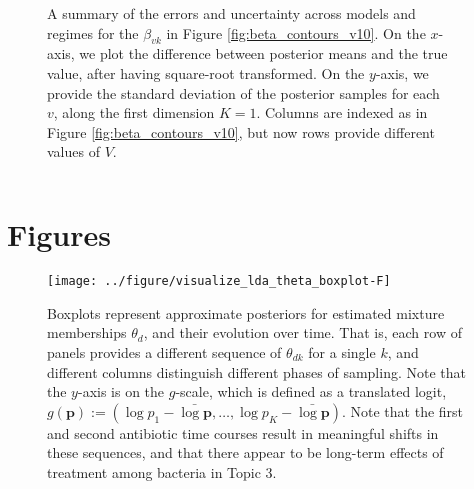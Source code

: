 \documentclass[final]{beamer}
\newlength{\sepwid}
\newlength{\onecolwid}
\begin{document}
\begin{frame}
\begin{columns}
\begin{column}{\onecolwid}
\begin{figure}[!p]
  \centering
  \caption{A summary of the errors and uncertainty across models and regimes for
    the $\beta_{vk}$ in Figure \ref{fig:beta_contours_v10}. On the $x$-axis,
    we plot the difference between posterior means and the true value, after
    having square-root transformed. On the $y$-axis, we provide the standard
    deviation of the posterior samples for each $v$, along the first dimension
    $K = 1$. Columns are indexed as in Figure \ref{fig:beta_contours_v10}, but
    now rows provide different values of $V$.
    \label{fig:beta_errors_lda} }
\end{figure}

\end{column} 

\begin{column}{\sepwid}\end{column}
\end{columns}
\begin{column}

\section{Figures}
\begin{figure}[!p]
  \centering\texttt{[image: ../figure/visualize\_lda\_theta\_boxplot-F]}
  \caption{Boxplots represent approximate posteriors for estimated mixture
    memberships $\theta_{d}$, and their evolution over time. That is, each row
    of panels provides a different sequence of $\theta_{dk}$ for a single $k$,
    and different columns distinguish different phases of sampling. Note that
    the $y$-axis is on the $g$-scale, which is defined as a translated logit,
    $g\left(\mathbf{p}\right) := \left(\log p_{1} - \bar{\log \mathbf{p}},
    \dots,\log p_{K} - \bar{\log \mathbf{p}}\right)$. Note that the first
    and second antibiotic time courses result in meaningful shifts in these
    sequences, and that there appear to be long-term effects of treatment among
    bacteria in Topic 3. \label{fig:antibiotics_lda_theta}}
\end{figure}
\end{column}

\end{frame}


\end{document}
